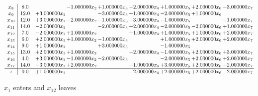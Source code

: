 \documentclass[10pt]{article}
\begin{document}
\[\begin{array}{c| c c@{\hskip 2pt} c@{\hskip 2pt} c@{\hskip 2pt} c@{\hskip 2pt} c@{\hskip 2pt} c@{\hskip 2pt} c@{\hskip 2pt} }
 x_{8}   &  8.0  &   & -1.000000 x_{2} & + 1.000000 x_{3} & -2.000000 x_{4} & + 1.000000 x_{5} & + 2.000000 x_{6} & -3.000000 x_{7}\\
 x_{9}   &  12.0 & + 3.000000 x_{1} &   & -3.000000 x_{3} & + 1.000000 x_{4} & -2.000000 x_{5} & + 1.000000 x_{6} &   \\
 x_{10}   &  12.0 & + 3.000000 x_{1} & -2.000000 x_{2} & -1.000000 x_{3} & -3.000000 x_{4} & -1.000000 x_{5} &   & -1.000000 x_{7}\\
 x_{11}   &  14.0 & -2.000000 x_{1} &   & -2.000000 x_{3} & + 2.000000 x_{4} & -2.000000 x_{5} & -2.000000 x_{6} & + 1.000000 x_{7}\\
 x_{12}   &  7.0 & -2.000000 x_{1} & + 1.000000 x_{2} &   & + 1.000000 x_{4} & + 1.000000 x_{5} & + 1.000000 x_{6} & + 2.000000 x_{7}\\
 x_{13}   &  6.0 & + 2.000000 x_{1} & + 1.000000 x_{2} & -1.000000 x_{3} &   & + 1.000000 x_{5} & + 2.000000 x_{6} & + 2.000000 x_{7}\\
 x_{14}   &  9.0 & + 1.000000 x_{1} &   & + 3.000000 x_{3} &   & -1.000000 x_{5} &    &   \\
 x_{15}   &  13.0 & + 2.000000 x_{1} & + 1.000000 x_{2} &   & -2.000000 x_{4} & -1.000000 x_{5} & + 2.000000 x_{6} & + 3.000000 x_{7}\\
 x_{16}   &  4.0 & + 3.000000 x_{1} & -1.000000 x_{2} & -2.000000 x_{3} &   & -2.000000 x_{5} & + 2.000000 x_{6} & + 2.000000 x_{7}\\
 x_{17}   &  14.0 & -3.000000 x_{1} & + 2.000000 x_{2} &   & -1.000000 x_{4} & + 3.000000 x_{5} & + 2.000000 x_{6} & -2.000000 x_{7}\\
\hline
z    &  0.0 & + 1.000000 x_{1} &    &   & -2.000000 x_{4} & + 2.000000 x_{5} & + 2.000000 x_{6} & -2.000000 x_{7}\\
\end{array}\]


 $ x_{1} $ enters and $ x_{12} $ leaves 
\end{document}
